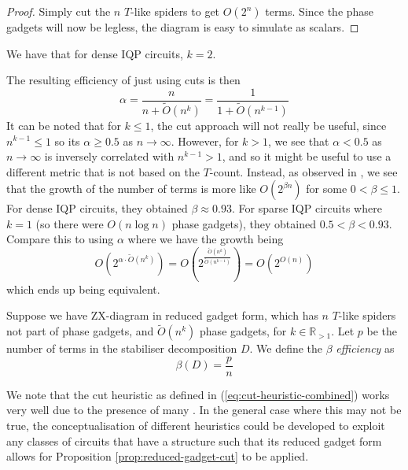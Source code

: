 \begin{proof}
    Simply cut the $n$ $T$-like spiders to get $O(2^n)$ terms.
    Since the phase gadgets will now be legless, the diagram is easy to simulate as scalars.
\end{proof}

We have that for dense IQP circuits, $k=2$.

The resulting efficiency of just using cuts is then
\begin{equation}
    \alpha = \frac{n}{n+\tilde{O}(n^k)} = \frac{1}{1+\tilde{O}(n^{k-1})}
\end{equation}
It can be noted that for $k \leq 1$, the cut approach will not really be useful,
since $n^{k-1} \leq 1$ so its $\alpha \geq 0.5$ as $n\to\infty$.
However, for $k > 1$, we see that $\alpha < 0.5$ as $n\to\infty$ is inversely correlated with $n^{k-1} > 1$,
and so it might be useful to use a different metric that is not based on the $T$-count.
Instead, as observed in \cite{codsi2023}, we see that the growth of the number of terms
is more like $O(2^{\beta n})$ for some $0 < \beta \leq 1$.
For dense IQP circuits, they obtained $\beta \approx 0.93$.
For sparse IQP circuits where $k=1$ (so there were $O(n\log n)$ phase gadgets), 
they obtained $0.5 < \beta < 0.93$.
Compare this to using $\alpha$ where we have the growth being 
\begin{equation}
O(2^{\alpha \cdot \tilde{O}(n^k)}) = O\left(2^{\frac{\tilde{O}(n^k)}{\tilde{O}(n^{k-1})}}\right) 
= O(2^{O(n)})
\end{equation}
which ends up being equivalent.

\begin{definition}
    \label{def:beta-efficiency}
    Suppose we have ZX-diagram in reduced gadget form, 
    which has $n$ $T$-like spiders not part of phase gadgets,
    and $\tilde{O}(n^k)$ phase gadgets, for $k\in \mathbb{R}_{> 1}$.
    Let $p$ be the number of terms in the stabiliser decomposition $D$.
    We define the $\beta$ \textit{efficiency} as
    \begin{equation}
        \beta(D) = \frac{p}{n}
    \end{equation}
\end{definition}

We note that the cut heuristic as defined in (\ref{eq:cut-heuristic-combined})
works very well due to the presence of many .
In the general case where this may not be true, 
the conceptualisation of different heuristics could be developed to
exploit any classes of circuits that have a structure such that 
its reduced gadget form allows for Proposition \ref{prop:reduced-gadget-cut} to be applied.

